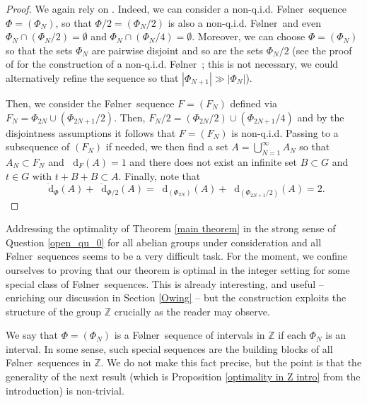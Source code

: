 \documentclass[reqno]{amsart}
\def\Z{{\mathbb Z}}
\newcommand*\diff{\mathop{}\!\mathrm{d}}
\theoremstyle{definition}
\theoremstyle{remark}
\theoremstyle{remark}
\newcommand{\Folner}{F\o{}lner}
\begin{document}
\begin{proof}
We again rely on \cite[Corollary 5.6]{charamaras_kousek_mountakis_radic2025BBingroups}. Indeed, we can consider a non-q.i.d. \Folner\ sequence $\Phi=(\Phi_N)$, so that $\Phi/2=(\Phi_N/2)$ is also a non-q.i.d. \Folner\ and even $\Phi_N\cap (\Phi_N/2)=\emptyset$ and $\Phi_N\cap (\Phi_N/4)=\emptyset$. Moreover, we can choose $\Phi=(\Phi_N)$ so that the sets $\Phi_{N}$ are pairwise disjoint and so are the sets $\Phi_N/2$ (see the proof of \cite[Lemma 5.5]{charamaras_kousek_mountakis_radic2025BBingroups} for the construction of a non-q.i.d. \Folner\ ; this is not necessary, we could alternatively refine the sequence so that $|\Phi_{N+1}| \gg |\Phi_N|$). 

Then, we consider the \Folner\ sequence $F=(F_N)$ defined via $F_N=\Phi_{2N} \cup (\Phi_{2N+1}/2)$. Then, $F_N/2=(\Phi_{2N}/2) \cup (\Phi_{2N+1}/4)$ and by the disjointness assumptions it follows that $F=(F_N)$ is non-q.i.d. Passing to a subsequence of $(F_N)$ if needed, we then find a set $A=\bigcup_{N=1}^{\infty} A_N$ so that $A_N\subset F_N$ and $\diff_{F}(A)=1$ and there does not exist an infinite set $B\subset G$ and 
$t\in G$ with $t+B+B\subset A$. Finally, note that 
$$\overline{\diff}_{\Phi}(A)+\overline{\diff}_{\Phi/2}(A)=\diff_{(\Phi_{2N})}(A)+\diff_{(\Phi_{2N+1}/2)}(A)=2.
$$
\end{proof}

Addressing the optimality of Theorem \ref{main theorem} in 
the 
strong sense of Question \ref{open_qu_0} for all abelian 
groups under consideration and all \Folner\ sequences seems 
to be a very difficult task. 
For the moment, we confine ourselves to proving that our 
theorem is optimal in the integer setting for some special 
class of \Folner\ sequences. This is already 
interesting, and useful -- enriching our discussion in Section
\ref{Owing} -- but the construction exploits the 
structure of the group $\Z$ crucially as the reader may 
observe.  

We say that $\Phi=(\Phi_N)$ is a \Folner\ sequence of 
intervals in $\Z$ if each $\Phi_N$ is an interval. In some 
sense, such special 
sequences are the building blocks of all \Folner\ sequences 
in $\Z$. We 
do not make this fact precise, but the 
point is that the generality of the next result (which is Proposition \ref{optimality in Z intro} from the introduction) is 
non-trivial. 
\end{document}
